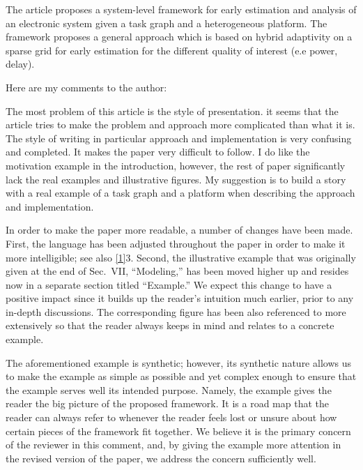 \begin{reviewer}
The article proposes a system-level framework for early estimation and analysis
of an electronic system given a task graph and a heterogeneous platform. The
framework proposes a general approach which is based on hybrid adaptivity on a
sparse grid  for early estimation for the different quality of interest (e.e
power, delay).

Here are my comments to the author:

The most problem of this article is the style of presentation. it seems that the
article tries to make the problem and approach more complicated than what it is.
The style of writing in particular approach and implementation is very confusing
and completed. It makes the paper very difficult to follow. I do like the
motivation example in the introduction, however, the rest of paper significantly
lack the real examples and illustrative figures. My suggestion is to build a
story with a real example of a task graph and a platform when describing the
approach and implementation.
\end{reviewer}

\begin{authors}
In order to make the paper more readable, a number of changes have been made.
First, the language has been adjusted throughout the paper in order to make it
more intelligible; see also \cref{1}{3}. Second, the illustrative example that
was originally given at the end of Sec.~VII, ``Modeling,'' has been moved higher
up and resides now in a separate section titled ``Example.'' We expect this
change to have a positive impact since it builds up the reader's intuition much
earlier, prior to any in-depth discussions. The corresponding figure has been
also referenced to more extensively so that the reader always keeps in mind and
relates to a concrete example.

The aforementioned example is synthetic; however, its synthetic nature allows us
to make the example as simple as possible and yet complex enough to ensure that
the example serves well its intended purpose. Namely, the example gives the
reader the big picture of the proposed framework. It is a road map that the
reader can always refer to whenever the reader feels lost or unsure about how
certain pieces of the framework fit together. We believe it is the primary
concern of the reviewer in this comment, and, by giving the example more
attention in the revised version of the paper, we address the concern
sufficiently well.

\begin{actions}
\end{actions}
\end{authors}

